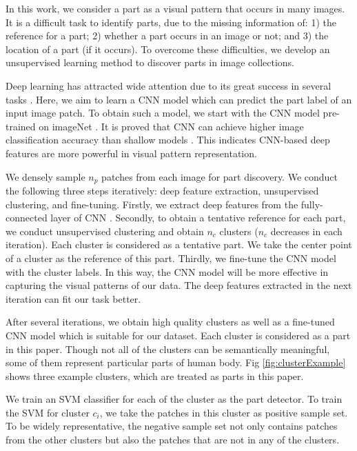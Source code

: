 \documentclass[journal]{IEEEtran}
\begin{document}
In this work, we consider a part as a visual pattern that occurs in many images. It is a difficult task to identify parts, due to the missing information of: 1) the reference for a part; 2) whether a part occurs in an image or not; and 3) the location of a part (if it occurs). To overcome these difficulties, we develop an unsupervised learning method to discover parts in image collections.


Deep learning has attracted wide attention due to its great success in several tasks \cite{Zuo2015Learning,Shuai2016Scene}. Here, we aim to learn a CNN model which can predict the part label of an input image patch.
To obtain such a model, we start with the CNN model pre-trained on imageNet \cite{CNN__NIPS2012_4824,jia2014caffe}. It is proved that CNN can achieve higher image classification accuracy than shallow models \cite{CNN__NIPS2012_4824}. This indicates CNN-based deep features are more powerful in visual pattern representation.

We densely sample $ n_p $ patches from each image for part discovery. We conduct the following three steps iteratively: deep feature extraction, unsupervised clustering, and fine-tuning.
Firstly, we extract deep features from the fully-connected layer of CNN \cite{CNN__NIPS2012_4824,jia2014caffe}. Secondly, to obtain a tentative reference for each part, we conduct unsupervised clustering and obtain $ n_c $ clusters ($ n_c $ decreases in each iteration). Each cluster is considered as a tentative part. We take the center point of a cluster as the reference of this part. Thirdly, we fine-tune the CNN model with the cluster labels. In this way, the CNN model will be more effective in capturing the visual patterns of our data. The deep features extracted in the next iteration can fit our task better.





After several iterations, we obtain high quality clusters as well as a fine-tuned CNN model which is suitable for our dataset. Each cluster is considered as a part in this paper. Though not all of the clusters can be semantically meaningful, some of them represent particular parts of human body. Fig \ref{fig:clusterExample} shows three example clusters, which are treated as parts in this paper.


We train an SVM classifier for each of the cluster as the part detector. To train the SVM for cluster $ c_i $, we take the patches in this cluster as positive sample set. To be widely representative, the negative sample set not only contains patches from the other clusters but also the patches that are not in any of the clusters.
\end{document}
